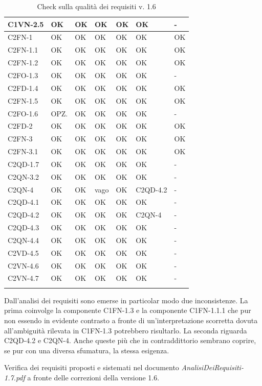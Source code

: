 \begin{footnotesize}
\begin{longtable}{|p{}|p{2cm}|p{2cm}|p{2cm}|p{2cm}|p{}|p{2cm}|}
 C1VN-2.5&  OK&  OK&  OK&  OK&  OK& -\\ \hline
 C2FN-1&  OK&  OK&  OK&  OK&  OK& OK\\ \hline
 C2FN-1.1&  OK&  OK&  OK&  OK&  OK& OK\\ \hline
 C2FN-1.2&  OK&  OK&  OK&  OK&  OK& OK\\ \hline
 C2FO-1.3&  OK&  OK&  OK&  OK&  OK& -\\ \hline
 C2FD-1.4&  OK&  OK&  OK&  OK&  OK& OK\\ \hline
 C2FN-1.5&  OK&  OK&  OK&  OK&  OK& OK\\ \hline
 C2FO-1.6&  OPZ.&  OK&  OK&  OK&  OK& -\\ \hline
 C2FD-2&  OK&  OK&  OK&  OK&  OK& OK\\ \hline
 C2FN-3&  OK&  OK&  OK&  OK&  OK& OK\\ \hline
 C2FN-3.1&  OK&  OK&  OK&  OK&  OK& OK\\ \hline
 C2QD-1.7&  OK&  OK&  OK&  OK&  OK& -\\ \hline
 C2QN-3.2&  OK&  OK&  OK&  OK&  OK& -\\ \hline
 C2QN-4&  OK&  OK&  vago&  OK&  C2QD-4.2& -\\ \hline
 C2QD-4.1&  OK&  OK&  OK&  OK&  OK& -\\ \hline
 C2QD-4.2&  OK&  OK&  OK&  OK&  C2QN-4& -\\ \hline
 C2QD-4.3&  OK&  OK&  OK&  OK&  OK& -\\ \hline
 C2QN-4.4& OK&  OK&  OK&  OK&  OK& -\\ \hline
 C2VD-4.5&  OK&  OK&  OK&  OK&  OK& -\\ \hline
 C2VN-4.6&  OK&  OK&  OK&  OK&  OK& -\\ \hline
 C2VN-4.7&  OK&  OK&  OK&  OK&  OK& -\\ \hline
 
\caption{Check sulla qualit\`a dei requisiti v. 1.6}
\end{longtable}
\end{footnotesize}

Dall'analisi dei requisiti sono emerse in particolar modo due inconsistenze. La
prima coinvolge la componente C1FN-1.3 e la componente C1FN-1.1.1 che pur non
essendo in evidente contrasto a fronte di un'interpretazione scorretta dovuta
all'ambiguit\`a rilevata in C1FN-1.3 potrebbero risultarlo.
La seconda riguarda C2QD-4.2 e C2QN-4. Anche queste pi\`u che in contraddittorio
sembrano coprire, se pur con una diversa sfumatura, la stessa esigenza.


Verifica dei requisiti proposti e sistemati nel documento
\emph{AnalisiDeiRequisiti-1.7.pdf} a fronte delle correzioni della versione 1.6.

